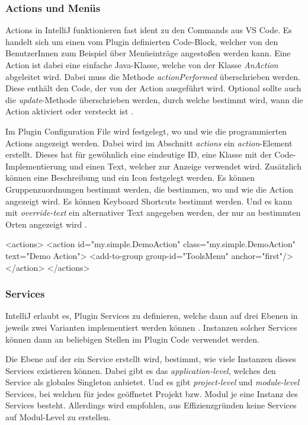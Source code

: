 \subsubsection{Actions und Menüs}
  Actions in IntelliJ funktionieren fast ident zu den Commands aus VS Code. Es handelt sich um
  einen vom Plugin definierten Code-Block, welcher von den BenutzerInnen zum Beispiel über Menüeinträge
  angestoßen werden kann. Eine Action ist dabei eine einfache Java-Klasse, welche von der Klasse \emph{AnAction}
  abgeleitet wird. Dabei muss die Methode \emph{actionPerformed} überschrieben werden. Diese 
  enthält den Code, der von der Action ausgeführt wird. Optional sollte auch die
  \emph{update}-Methode überschrieben werden, durch welche bestimmt wird, wann die Action 
  aktiviert oder versteckt ist \cite{IntelliJPlatformSDKActions,IntelliJPlatformSDKActionSystem}.

  Im Plugin Configuration File wird festgelegt, wo und wie die programmierten Actions angezeigt
  werden. Dabei wird im Abschnitt \emph{actions} ein \emph{action}-Element erstellt.
  Dieses hat für gewöhnlich eine eindeutige ID, eine Klasse mit der Code-Implementierung und
  einen Text, welcher zur Anzeige verwendet wird. Zusätzlich können eine Beschreibung und
  ein Icon festgelegt werden. Es können Gruppenzuordnungen bestimmt werden, die bestimmen,
  wo und wie die Action angezeigt wird. Es können Keyboard Shortcuts bestimmt werden. Und
  es kann mit \emph{override-text} ein alternativer Text angegeben werden, der nur an
  bestimmten Orten angezeigt wird \cite{IntelliJPlatformSDKConfigurationActions}.
  
\begin{XmlCode}
    <actions>
        <action id="my.simple.DemoAction"
                class="my.simple.DemoAction" 
                text="Demo Action">
            <add-to-group group-id="ToolsMenu" anchor="first"/>
        </action>
    </actions>
\end{XmlCode}

\subsubsection{Services}
  IntelliJ erlaubt es, Plugin Services zu definieren, welche dann auf drei Ebenen
  in jeweils zwei Varianten implementiert werden können \cite{IntelliJPlatformSDKServices}. 
  Instanzen solcher Services können dann an beliebigen Stellen im Plugin Code verwendet werden.

  Die Ebene auf der ein Service erstellt wird, bestimmt, wie viele Instanzen dieses 
  Services existieren können. Dabei gibt es das \emph{application-level}, welches den Service
  als globales Singleton \cite{2005Dp:e}
  anbietet. Und es gibt \emph{project-level} und \emph{module-level} Services, bei welchen
  für jedes geöffnetet Projekt bzw. Modul je eine Instanz des Services besteht. Allerdings 
  wird empfohlen, aus Effizienzgründen keine Services auf Modul-Level zu erstellen.
  
